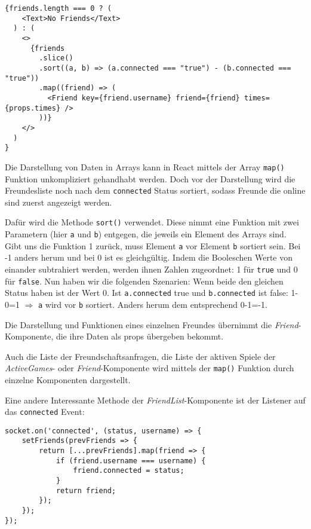 \begin{lstlisting}[style=codeStyle, caption={Darstellung der Freundesliste in \textit{FriendList}}, label={lst:FriendList}]
{friends.length === 0 ? (
    <Text>No Friends</Text>
  ) : (
    <>
      {friends
        .slice()
        .sort((a, b) => (a.connected === "true") - (b.connected === "true"))
        .map((friend) => (
          <Friend key={friend.username} friend={friend} times={props.times} />
        ))}
    </>
  )
}
\end{lstlisting}

Die Darstellung von Daten in Arrays kann in React mittels der Array \verb|map()| Funktion unkompliziert gehandhabt werden. Doch vor der Darstellung wird die Freundesliste noch nach dem \verb|connected| Status sortiert, sodass Freunde die online sind zuerst angezeigt werden.

Dafür wird die Methode \verb|sort()| verwendet. Diese nimmt eine Funktion mit zwei Parametern (hier \verb|a| und \verb|b|) entgegen, die jeweils ein Element des Arrays sind. Gibt uns die Funktion 1 zurück, muss Element \verb|a| vor Element \verb|b| sortiert sein. Bei -1 anders herum und bei 0 ist es gleichgültig. Indem die Booleschen Werte von einander subtrahiert werden, werden ihnen Zahlen zugeordnet: 1 für \verb|true| und 0 für \verb|false|. Nun haben wir die folgenden Szenarien: Wenn beide den gleichen Status haben ist der Wert 0. Ist \verb|a.connected| true und \verb|b.connected| ist false: 1-0=1 $\Rightarrow$ \verb|a| wird vor \verb|b| sortiert. Anders herum dem entsprechend 0-1=-1.

Die Darstellung und Funktionen eines einzelnen Freundes übernimmt die \textit{Friend}-Komponente, die ihre Daten als props übergeben bekommt.

Auch die Liste der Freundschaftsanfragen, die Liste der aktiven Spiele der \textit{ActiveGames}- oder \textit{Friend}-Komponente wird mittels der \verb|map()| Funktion durch einzelne Komponenten dargestellt.

Eine andere Interessante Methode der \textit{FriendList}-Komponente ist der Listener auf das \verb|connected| Event:

\begin{lstlisting}[style=codeStyle, caption={Ausschnitt aus index.js und die Datei authRouter.js}, label={lst:routing-Middlewares}]
socket.on('connected', (status, username) => {
    setFriends(prevFriends => {
        return [...prevFriends].map(friend => {
            if (friend.username === username) {
                friend.connected = status;
            }
            return friend;
        });
    });
});
\end{lstlisting}

